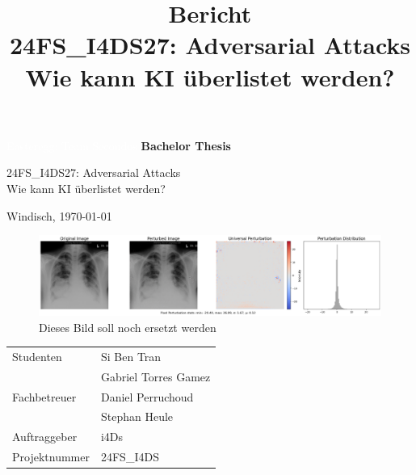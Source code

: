 \title{\textbf{Bericht}\break \\ 24FS\_I4DS27: Adversarial Attacks \\ Wie kann KI überlistet werden?} %

\begin{titlepage}
    \textcolor{white}{Easteregg: Team Secondos}
    \vfill
    \centering
    \vspace{0.5cm}
    \huge{\textbf{Bachelor Thesis}}
    
    \vspace{0.5cm}
    \huge{24FS\_I4DS27: Adversarial Attacks \\ Wie kann KI überlistet werden?}
    \vspace{0.5cm}
    
    \Large{Windisch, \germandate\today}      

    \vfill

    \begin{figure}[H]
        \centering
        \includegraphics[width=\columnwidth]{01-images/01-titleimage.png}
        \caption{Dieses Bild soll noch ersetzt werden}
        \label{01-titleimage}
    \end{figure}
    
    \vfill

    \large{
    \begin{tabular}{@{}p{7cm}l}
        Studenten                  &    Si Ben Tran\\
                                   &    Gabriel Torres Gamez\\[2ex]
        
        Fachbetreuer               &    Daniel Perruchoud\\
                                   &    Stephan Heule\\[2ex]
                                   
        Auftraggeber               &    i4Ds\\
        Projektnummer              &    24FS\_I4DS\\[4ex]
        

\end{tabular}}
\end{titlepage}
